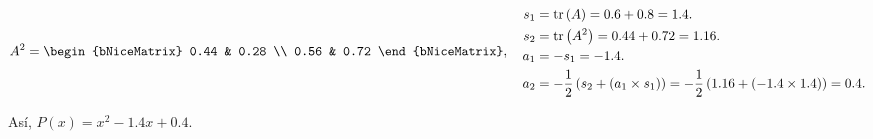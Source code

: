 \begin{frame}
\begin{solution}
\begin{enumerate}[c)]
			      \begin{equation*}
				      A^{2}=
				      \begin{bNiceMatrix}
					      0.44 & 0.28 \\
					      0.56 & 0.72
				      \end{bNiceMatrix},\quad
				      \begin{aligned}
					      s_{1} & =
					      \operatorname{tr}
					      \left(A\right)=
					      0.6+0.8=
					      1.4.      \\
					      s_{2} & =
					      \operatorname{tr}
					      \left(A^{2}\right)=
					      0.44+0.72=
					      1.16.     \\
					      a_{1} & =
					      -s_{1}=
					      -1.4.     \\
					      a_{2} & =
					      -\dfrac{1}{2}
					      \left(
					      s_{2}+
					      \left(a_{1}\times s_{1}\right)
					      \right)=
					      -\dfrac{1}{2}
					      \left(
					      1.16+
					      \left(-1.4\times 1.4\right)
					      \right)=
					      0.4.
				      \end{aligned}
			      \end{equation*}

			      Así,
			      \begin{math}
				      P\left(x\right)=
				      x^{2}-1.4x+0.4
			      \end{math}.
		\end{enumerate}
	\end{solution}
\end{frame}

